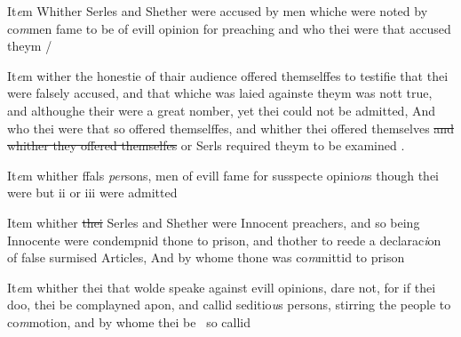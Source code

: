 \documentclass[12pt, a4paper]{book}
\begin{document}
				\marginpar[\vspace{0.5cm}{\textcolor{Gray}{6}}]{}
			
 
		\ifthenelse{\isodd{\thepage}}
		{\reversemarginpar}
		{\normalmarginpar}
		It\textit{e}m Whither Serles and Shether were accused by men whiche
were noted by co\textit{m}men fame to be of evill opinion for preaching
and who thei were that accused theym /
            		
				\marginpar[\vspace{0.5cm}{\textcolor{Gray}{7}}]{}
			

		\ifthenelse{\isodd{\thepage}}
		{\reversemarginpar}
		{\normalmarginpar}
		It\textit{e}m wither the honestie of thair audience offered themselffes to 
testifie that thei were falsely accused, and that whiche was
laied againste theym was nott true, and althoughe their were 
a great nomber, yet thei 
			could not be admitted, And who thei were
that so offered themselffes, and whither thei offered themselves \sout{and whither they offered themselfes}
               or Serls required theym to be examined
			. 
            		
				\marginpar[\vspace{0.5cm}{\textcolor{Gray}{8}}]{}
			

		\ifthenelse{\isodd{\thepage}}
		{\reversemarginpar}
		{\normalmarginpar}
		It\textit{e}m whither ffals \textit{per}sons, men of evill fame for susspecte opinio\textit{n}s
though thei were but ii or iii were admitted
            		
				\marginpar[\vspace{0.5cm}{\textcolor{Gray}{9}}]{}
			

		\ifthenelse{\isodd{\thepage}}
		{\reversemarginpar}
		{\normalmarginpar}
		 Item whither \sout{thei }
               Serles and Shether
			 were Innocent preachers, and so being Innocente
were condempnid thone to prison, and thother to reede a
declarac\textit{i}on of false surmised Articles, And by whome thone 
was co\textit{m}mittid to prison
            		
				\marginpar[\vspace{0.5cm}{\textcolor{Gray}{10}}]{}
			

		\ifthenelse{\isodd{\thepage}}
		{\reversemarginpar}
		{\normalmarginpar}
		 It\textit{e}m whither thei that wolde speake against evill opinions, dare 
not, for if thei doo, thei be complayned apon, and callid seditio\textit{u}s
persons, stirring the people to co\textit{m}motion, and by whome thei be 
so callid
            		
\end{document}
